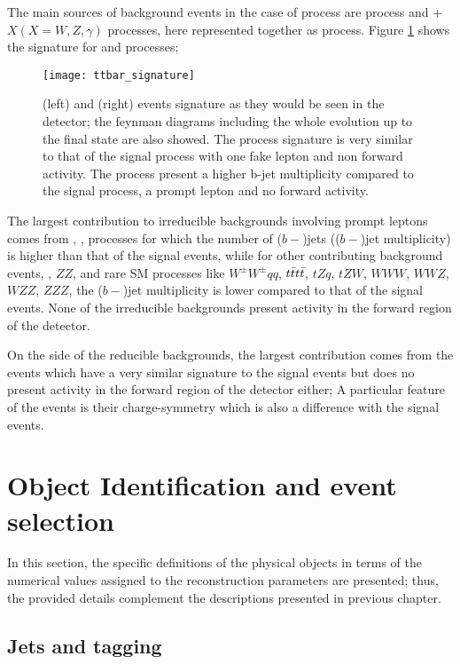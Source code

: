 The main sources of background events in the case of \tHq process are \ttbar process and \ttbar + $X (X=W,Z,\gamma)$ processes, here represented together as \ttV process. Figure \ref{fig:ttbar_sign} shows the signature for \ttbar and \ttW processes;     

\begin{figure}[!htb]
\centering
\texttt{[image: ttbar\_signature]}
\caption[\ttbar and \ttW events signature]{\ttbar(left) and \ttW(right) events signature as they would be seen in the detector; the feynman diagrams including the whole evolution up to the final state are also showed. The \ttbar process signature is very similar to that of the signal process with one fake lepton and non forward activity. The \ttW process present a higher b-jet multiplicity compared to the signal process, a prompt lepton and no forward activity.}
\label{fig:ttbar_sign}
\end{figure}

The largest contribution to irreducible backgrounds involving prompt leptons comes from \ttW, \ttZ, processes for which the number of ($b-$)jets (($b-$)jet multiplicity) is higher than that of the signal events, while for other contributing background events, \WZ, $ZZ$, and rare SM processes like $W^\pm W^\pm qq$, $t\bar{t}t\bar{t}$, $tZq$, $tZW$, $WWW$, $WWZ$, $WZZ$, $ZZZ$, the ($b-$)jet multiplicity is lower compared to that of the signal events. None of the irreducible backgrounds present activity in the forward region of the detector.

On the side of the reducible backgrounds, the largest contribution comes from the \ttbar events which have a very similar signature to the signal events but does no present activity in the forward region of the detector either; A particular feature of the \ttbar events is their charge-symmetry which is also a difference with the signal events.      


\section{Object Identification and event selection}\label{sec:ob_id}


In this section, the specific definitions of the physical objects in terms of the numerical values assigned to the reconstruction parameters are presented; thus, the provided details complement the descriptions presented in previous chapter. 

\subsection{Jets and \bjet tagging}

